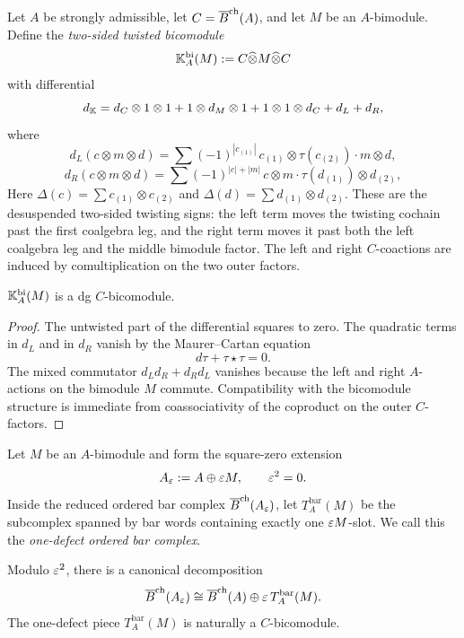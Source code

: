 \begin{definition}
\label{def:Kbi}
Let $A$ be strongly admissible, let $C=\overline{B}^{\mathrm{ch}}(A)$, and let $M$ be an $A$-bimodule.
Define the \emph{two-sided twisted bicomodule}
\[
\mathbb{K}_A^{\mathrm{bi}}(M):=C\widehat\otimes M\widehat\otimes C
\]
with differential
\[
d_{\mathbb{K}}
=
d_C\otimes 1\otimes 1 + 1\otimes d_M\otimes 1 + 1\otimes 1\otimes d_C + d_L+d_R,
\]
where
\[
d_L(c\otimes m\otimes d)
=
\sum (-1)^{|c_{(1)}|}\, c_{(1)}\otimes \tau(c_{(2)})\cdot m\otimes d,
\]
\[
d_R(c\otimes m\otimes d)
=
\sum (-1)^{|c|+|m|}\, c\otimes m\cdot \tau(d_{(1)})\otimes d_{(2)},
\]
Here $\Delta(c)=\sum c_{(1)}\otimes c_{(2)}$ and
$\Delta(d)=\sum d_{(1)}\otimes d_{(2)}$. These are the
desuspended two-sided twisting signs: the left term moves the
twisting cochain past the first coalgebra leg, and the right term
moves it past both the left coalgebra leg and the middle bimodule
factor.
The left and right $C$-coactions are induced by comultiplication on the two outer factors.
\end{definition}

\begin{lemma}
\ClaimStatusProvedHere
\label{lem:Kbi-dg}
$\mathbb{K}_A^{\mathrm{bi}}(M)$ is a dg $C$-bicomodule.
\end{lemma}

\begin{proof}
The untwisted part of the differential squares to zero. The quadratic terms in $d_L$ and in $d_R$
vanish by the Maurer--Cartan equation
\[
d\tau+\tau\star\tau=0.
\]
The mixed commutator $d_Ld_R+d_Rd_L$ vanishes because the left and right $A$-actions on the
bimodule $M$ commute. Compatibility with the bicomodule structure is immediate from coassociativity
of the coproduct on the outer $C$-factors.
\end{proof}

\begin{definition}
Let $M$ be an $A$-bimodule and form the square-zero extension
\[
A_\varepsilon:=A\oplus \varepsilon M,\qquad \varepsilon^2=0.
\]
Inside the reduced ordered bar complex $\overline{B}^{\mathrm{ch}}(A_\varepsilon)$, let $T_A^{\mathrm{bar}}(M)$ be the
subcomplex spanned by bar words containing exactly one $\varepsilon M$-slot.
We call this the \emph{one-defect ordered bar complex}.
\end{definition}

\begin{proposition}
\ClaimStatusProvedHere
\label{prop:one-defect}
Modulo $\varepsilon^2$, there is a canonical decomposition
\[
\overline{B}^{\mathrm{ch}}(A_\varepsilon)\cong \overline{B}^{\mathrm{ch}}(A)\oplus \varepsilon\, T_A^{\mathrm{bar}}(M).
\]
The one-defect piece $T_A^{\mathrm{bar}}(M)$ is naturally a $C$-bicomodule.
\end{proposition}

